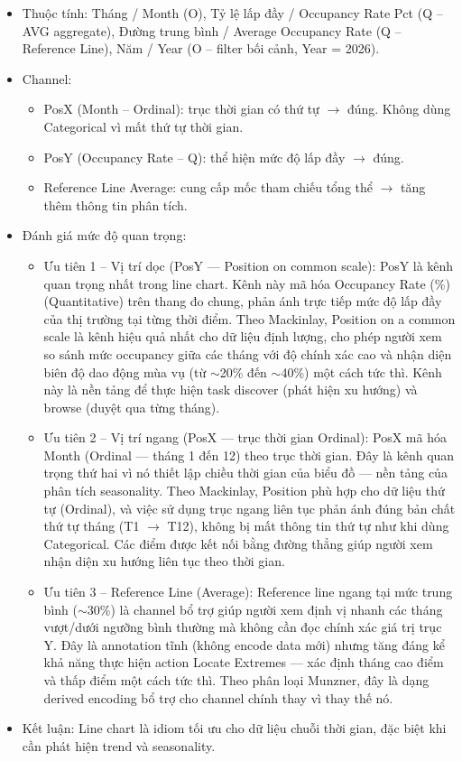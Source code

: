 \begin{itemize}
    \item Thuộc tính: Tháng / Month (O), Tỷ lệ lấp đầy / Occupancy Rate Pct (Q -- AVG aggregate), Đường trung bình / Average Occupancy Rate (Q -- Reference Line), Năm / Year (O -- filter bối cảnh, Year = 2026).
    \item Channel:
    \begin{itemize}
        \item PosX (Month -- Ordinal): trục thời gian có thứ tự $\rightarrow$ đúng. Không dùng Categorical vì mất thứ tự thời gian.
        \item PosY (Occupancy Rate -- Q): thể hiện mức độ lấp đầy $\rightarrow$ đúng.
        \item Reference Line Average: cung cấp mốc tham chiếu tổng thể $\rightarrow$ tăng thêm thông tin phân tích.
    \end{itemize}
    \item Đánh giá mức độ quan trọng:
    \begin{itemize}
        \item Ưu tiên 1 -- Vị trí dọc (PosY --- Position on common scale): PosY là kênh quan trọng nhất trong line chart. Kênh này mã hóa Occupancy Rate (\%) (Quantitative) trên thang đo chung, phản ánh trực tiếp mức độ lấp đầy của thị trường tại từng thời điểm. Theo Mackinlay, Position on a common scale là kênh hiệu quả nhất cho dữ liệu định lượng, cho phép người xem so sánh mức occupancy giữa các tháng với độ chính xác cao và nhận diện biên độ dao động mùa vụ (từ $\sim$20\% đến $\sim$40\%) một cách tức thì. Kênh này là nền tảng để thực hiện task discover (phát hiện xu hướng) và browse (duyệt qua từng tháng).
        \item Ưu tiên 2 -- Vị trí ngang (PosX --- trục thời gian Ordinal): PosX mã hóa Month (Ordinal --- tháng 1 đến 12) theo trục thời gian. Đây là kênh quan trọng thứ hai vì nó thiết lập chiều thời gian của biểu đồ --- nền tảng của phân tích seasonality. Theo Mackinlay, Position phù hợp cho dữ liệu thứ tự (Ordinal), và việc sử dụng trục ngang liên tục phản ánh đúng bản chất thứ tự tháng (T1 $\rightarrow$ T12), không bị mất thông tin thứ tự như khi dùng Categorical. Các điểm được kết nối bằng đường thẳng giúp người xem nhận diện xu hướng liên tục theo thời gian.
        \item Ưu tiên 3 -- Reference Line (Average): Reference line ngang tại mức trung bình ($\sim$30\%) là channel bổ trợ giúp người xem định vị nhanh các tháng vượt/dưới ngưỡng bình thường mà không cần đọc chính xác giá trị trục Y. Đây là annotation tĩnh (không encode data mới) nhưng tăng đáng kể khả năng thực hiện action Locate Extremes --- xác định tháng cao điểm và thấp điểm một cách tức thì. Theo phân loại Munzner, đây là dạng derived encoding bổ trợ cho channel chính thay vì thay thế nó.
    \end{itemize}
    \item Kết luận: Line chart là idiom tối ưu cho dữ liệu chuỗi thời gian, đặc biệt khi cần phát hiện trend và seasonality.
\end{itemize}

